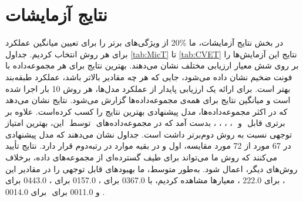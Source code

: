 \section{نتایج آزمایشات}
در بخش نتایج آزمایشات، ما $\%$20 از ویژگی‌های برتر را برای تعیین میانگین عملکرد برای هر روش انتخاب کردیم. جداول \ref{tab:MicT} تا \ref{tab:CVET} نتایج این آزمایش‌ها را بر روی شش معیار ارزیابی مختلف نشان می‌دهند. بهترین نتایج برای هر مجموعه‌داده با فونت ضخیم نشان داده می‌شود، جایی که هر چه مقادیر بالاتر باشد، عملکرد طبقه‌بند بهتر است. برای ارائه یک ارزیابی پایدار‌‌ از عملکرد مدل‌ها، هر روش 10 بار اجرا شده‌ است و میانگین نتایج برای همه‌ی مجموعه‌داده‌ها گزارش می‌شود. نتایج نشان می‌دهد که در اکثر مجموعه‌داده‌ها، مدل پیشنهادی بهترین نتایج را کسب کرده‌است. علاوه بر این، بهترین 
امتیاز‎ ‎ توسط ‎‎ بدست آمد که در مجموعه‌داده‌های ‎‎، ‎‎، ‎‎، ‎‎، ‎‎ و ‎‎ برتری قابل توجهی نسبت به روش دوم‌برتر داشت است. جداول نشان می‌دهند که مدل پیشنهادی در 67 مورد از 72 مورد مقایسه، اول و در بقیه‌ موارد در رتبه‌دوم قرار دارد.‌ نتایج تأیید می‌کنند که روش ما می‌تواند برای طیف گسترده‌ای از مجموعه‌های داده، برخلاف روش‌های دیگر، اعمال شود. به‌طور متوسط، ما بهبودهای قابل توجهی را در مقادیر این معیارها مشاهده کردیم، با 0367.0 برای 
،
0157.0 برای
،
0443.0 برای 
‎‎،
222.0 برای
‎‎،
{0014.0} برای
‎‎ و
{0011.0} برای
‎.
